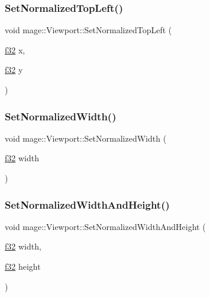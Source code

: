 \hypertarget{structmage_1_1_viewport_aca93791eaf1102314871b1b440e3dc4b}{}\label{structmage_1_1_viewport_aca93791eaf1102314871b1b440e3dc4b} 
\subsubsection{\texorpdfstring{Set\+Normalized\+Top\+Left()}{SetNormalizedTopLeft()}}
{\footnotesize\ttfamily void mage\+::\+Viewport\+::\+Set\+Normalized\+Top\+Left (\begin{DoxyParamCaption}\item[{\hyperlink{namespacemage_a6a44ad388483959dc4dff9f2aef91431}{f32}}]{x,  }\item[{\hyperlink{namespacemage_a6a44ad388483959dc4dff9f2aef91431}{f32}}]{y }\end{DoxyParamCaption})\hspace{0.3cm}{\ttfamily [noexcept]}}

\hypertarget{structmage_1_1_viewport_a08778de64f3a834e61043458fe44a161}{}\label{structmage_1_1_viewport_a08778de64f3a834e61043458fe44a161} 
\subsubsection{\texorpdfstring{Set\+Normalized\+Width()}{SetNormalizedWidth()}}
{\footnotesize\ttfamily void mage\+::\+Viewport\+::\+Set\+Normalized\+Width (\begin{DoxyParamCaption}\item[{\hyperlink{namespacemage_a6a44ad388483959dc4dff9f2aef91431}{f32}}]{width }\end{DoxyParamCaption})\hspace{0.3cm}{\ttfamily [noexcept]}}

\hypertarget{structmage_1_1_viewport_a53a2793324607aa80427cc4f29e6cea9}{}\label{structmage_1_1_viewport_a53a2793324607aa80427cc4f29e6cea9} 
\subsubsection{\texorpdfstring{Set\+Normalized\+Width\+And\+Height()}{SetNormalizedWidthAndHeight()}}
{\footnotesize\ttfamily void mage\+::\+Viewport\+::\+Set\+Normalized\+Width\+And\+Height (\begin{DoxyParamCaption}\item[{\hyperlink{namespacemage_a6a44ad388483959dc4dff9f2aef91431}{f32}}]{width,  }\item[{\hyperlink{namespacemage_a6a44ad388483959dc4dff9f2aef91431}{f32}}]{height }\end{DoxyParamCaption})\hspace{0.3cm}{\ttfamily [noexcept]}}

